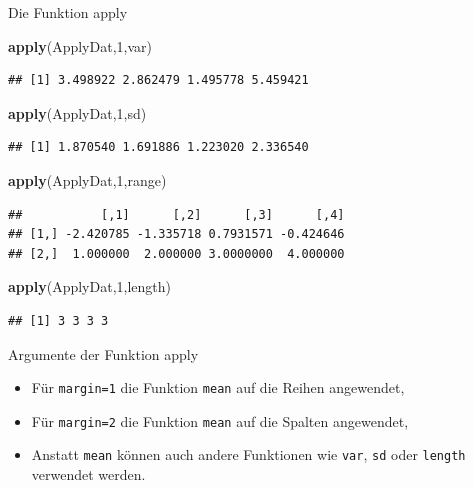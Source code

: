 \documentclass[
  ignorenonframetext,
]{beamer}
\newenvironment{Shaded}{\begin{snugshade}}{\end{snugshade}}
\newcommand{\DecValTok}[1]{\textcolor[rgb]{0.27,0.67,0.26}{#1}}
\newcommand{\KeywordTok}[1]{\textcolor[rgb]{0.26,0.66,0.93}{\textbf{#1}}}
\newcommand{\NormalTok}[1]{\textcolor[rgb]{0.74,0.68,0.62}{#1}}
\begin{document}
\begin{frame}[fragile]{Die Funktion apply}
\protect\hypertarget{die-funktion-apply}{}

\begin{Shaded}
\begin{Highlighting}[]
\KeywordTok{apply}\NormalTok{(ApplyDat,}\DecValTok{1}\NormalTok{,var)}
\end{Highlighting}
\end{Shaded}

\begin{verbatim}
## [1] 3.498922 2.862479 1.495778 5.459421
\end{verbatim}

\begin{Shaded}
\begin{Highlighting}[]
\KeywordTok{apply}\NormalTok{(ApplyDat,}\DecValTok{1}\NormalTok{,sd)}
\end{Highlighting}
\end{Shaded}

\begin{verbatim}
## [1] 1.870540 1.691886 1.223020 2.336540
\end{verbatim}

\begin{Shaded}
\begin{Highlighting}[]
\KeywordTok{apply}\NormalTok{(ApplyDat,}\DecValTok{1}\NormalTok{,range)}
\end{Highlighting}
\end{Shaded}

\begin{verbatim}
##           [,1]      [,2]      [,3]      [,4]
## [1,] -2.420785 -1.335718 0.7931571 -0.424646
## [2,]  1.000000  2.000000 3.0000000  4.000000
\end{verbatim}

\begin{Shaded}
\begin{Highlighting}[]
\KeywordTok{apply}\NormalTok{(ApplyDat,}\DecValTok{1}\NormalTok{,length)}
\end{Highlighting}
\end{Shaded}

\begin{verbatim}
## [1] 3 3 3 3
\end{verbatim}

\end{frame}

\begin{frame}[fragile]{Argumente der Funktion apply}
\protect\hypertarget{argumente-der-funktion-apply}{}

\begin{itemize}
\item
  Für \texttt{margin=1} die Funktion \texttt{mean} auf die Reihen
  angewendet,
\item
  Für \texttt{margin=2} die Funktion \texttt{mean} auf die Spalten
  angewendet,
\item
  Anstatt \texttt{mean} können auch andere Funktionen wie \texttt{var},
  \texttt{sd} oder \texttt{length} verwendet werden.
\end{itemize}

\end{frame}
\end{document}
